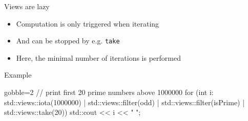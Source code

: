 \begin{frame}[fragile]
  \begin{block}{Views are lazy}
    \begin{itemize}
    \item Computation is only triggered when iterating
    \item And can be stopped by e.g. \texttt{take}
    \item Here, the minimal number of iterations is performed
    \end{itemize}
  \end{block}
  \begin{exampleblock}{Example}
    \begin{cppcode*}{gobble=2}
      // print first 20 prime numbers above 1000000
      for (int i: std::views::iota(1000000)
                  | std::views::filter(odd)
                  | std::views::filter(isPrime)
                  | std::views::take(20)) {
        std::cout << i << " ";
      }
    \end{cppcode*}
  \end{exampleblock}
\end{frame}

